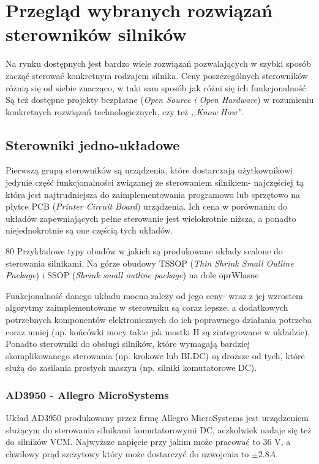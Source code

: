 \section{Przegląd wybranych rozwiązań sterowników silników}
\label{s:sterowniki} 

Na rynku dostępnych jest bardzo wiele rozwiązań pozwalających w szybki sposób zacząć sterować konkretnym rodzajem silnika. Ceny poszczególnych sterowników różnią się od siebie znacząco, w taki sam sposób jak różni się ich funkcjonalność. Są też dostępne projekty bezpłatne ({\it Open Source i Open Hardware}) w rozumieniu konkretnych rozwiązań technologicznych, czy też {\it ,,Know How''}.

\subsection{Sterowniki jedno-układowe}

Pierwszą grupą sterowników są urządzenia, które dostarczają użytkownikowi jedynie część funkcjonalności związanej ze sterowaniem silnikiem- najczęściej tą która jest najtrudniejsza do zaimplementowania programowo lub sprzętowo na płytce PCB ({\it Printer Circuit Board}) urządzenia. Ich cena w porównaniu do układów zapewniających pełne sterowanie jest wielokrotnie niższa, a ponadto niejednokrotnie są one częścią tych układów. 

	{80}
	{Przykładowe typy obudów w jakich są produkowane układy scalone do sterowania silnikami. Na górze obudowy TSSOP ({\it Thin Shrink Small Outline Package}) i SSOP ({\it Shrink small outline package}) na dole}
	{oprWlasne}

Funkcjonalność danego układu mocno zależy od jego ceny- wraz z jej wzrostem algorytmy zaimplementowane w sterowniku są coraz lepsze, a dodatkowych potrzebnych komponentów elektronicznych do ich poprawnego działania potrzeba coraz mniej (np. końcówki mocy takie jak mostki H są zintegrowane w układzie). Ponadto sterowniki do obsługi silników, które wymagają bardziej skomplikowanego sterowania (np. krokowe lub BLDC) są droższe od tych, które służą do zasilania prostych maszyn (np. silniki komutatorowe DC). 

\subsubsection{AD3950 - Allegro MicroSystems}
\label{ss:allegro}

Układ AD3950 produkowany przez firmę Allegro MicroSystems jest urządzeniem służącym do sterowania silnikami komutatorowymi DC, aczkolwiek nadaje się też do silników VCM. Najwyższe napięcie przy jakim może pracować to 36 V, a chwilowy prąd szczytowy który może dostarczyć do uzwojenia to $ \pm2.8 A $.

